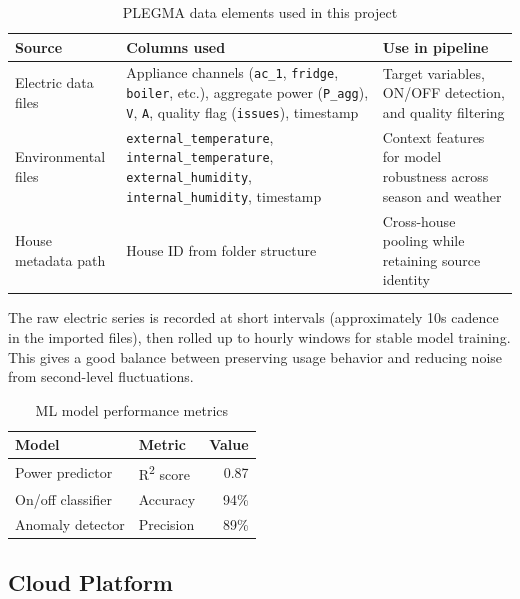\documentclass[12pt, a4paper]{article}
\numberwithin{figure}{section}
\numberwithin{table}{section}
\begin{document}
	\begin{table}[H]
		\centering
		\caption{PLEGMA data elements used in this project}
		\label{tab:plegma-elements}
		\vspace{6pt}
		\begin{tabular}{|l|p{5.2cm}|p{4.1cm}|}
			\hline
			\textbf{Source} & \textbf{Columns used} & \textbf{Use in pipeline} \\
			\hline
			Electric data files & Appliance channels (\texttt{ac\_1}, \texttt{fridge}, \texttt{boiler}, etc.), aggregate power (\texttt{P\_agg}), \texttt{V}, \texttt{A}, quality flag (\texttt{issues}), timestamp & Target variables, ON/OFF detection, and quality filtering \\
			\hline
			Environmental files & \texttt{external\_temperature}, \texttt{internal\_temperature}, \texttt{external\_humidity}, \texttt{internal\_humidity}, timestamp & Context features for model robustness across season and weather \\
			\hline
			House metadata path & House ID from folder structure & Cross-house pooling while retaining source identity \\
			\hline
		\end{tabular}
	\end{table}
	
	The raw electric series is recorded at short intervals (approximately 10s cadence in the imported files), then rolled up to hourly windows for stable model training. This gives a good balance between preserving usage behavior and reducing noise from second-level fluctuations.
	
	\begin{table}[H]
		\centering
		\caption{ML model performance metrics}
		\label{tab:ml-metrics}
		\vspace{6pt}
		\begin{tabular}{|l|l|r|}
			\hline
			\textbf{Model} & \textbf{Metric} & \textbf{Value} \\
			\hline
			Power predictor & R\textsuperscript{2} score & 0.87 \\
			\hline
			On/off classifier & Accuracy & 94\% \\
			\hline
			Anomaly detector & Precision & 89\% \\
			\hline
		\end{tabular}
	\end{table}
	
	\subsection{Cloud Platform}
	
\end{document}
